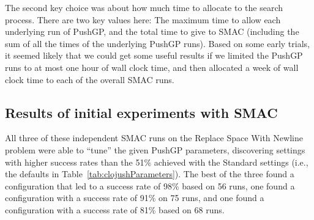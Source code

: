 The second key choice was about how much time to allocate to the search
process. There are two key values here: The maximum time to allow 
each underlying run of PushGP, and the total time to give to SMAC 
(including the sum of all the times of the underlying PushGP runs). 
Based on some early trials, it seemed likely that we could get some 
useful results if we limited the PushGP runs to at most one hour of 
wall clock time, and then allocated a week of wall clock time to each 
of the overall SMAC runs.

\subsection{Results of initial experiments with SMAC}

All three of these independent SMAC runs on the Replace Space With Newline
problem were able to ``tune'' the given PushGP parameters, discovering settings
with higher success rates than the 51\% achieved with
the Standard settings (i.e., the defaults in Table~\ref{tab:clojushParameters}).
The best of the three found a configuration that led to a success rate of
98\% based on 56 runs, one found a configuration with a success rate of 91\%
on 75 runs, and one found a configuration with a success rate of 81\% 
based on 68 runs.

%

